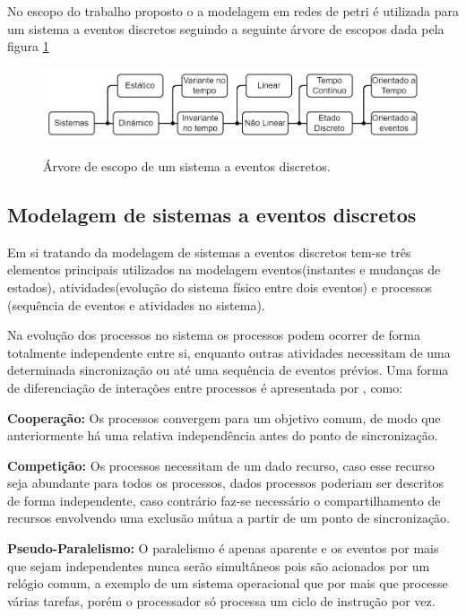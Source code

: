 No escopo do trabalho proposto o a modelagem em redes de petri é utilizada para um sistema a eventos discretos seguindo a seguinte árvore de escopos dada pela figura \ref{fig:arvore_escopo}
\begin{figure}
    \centering
    \caption{Árvore de escopo de um sistema a eventos discretos.}
    \includegraphics[scale=0.4]{figures/Petri/arvore_escopo.png}
    \label{fig:arvore_escopo}
\end{figure}

    
\subsection{Modelagem de sistemas a eventos discretos}

Em si tratando da modelagem de sistemas a eventos discretos tem-se três elementos principais utilizados na modelagem eventos(instantes e mudanças de estados), atividades(evolução do sistema físico entre dois eventos) e processos (sequência de eventos e atividades no sistema). 

Na evolução dos processos no sistema os processos podem ocorrer de forma totalmente independente entre si, enquanto outras atividades necessitam de uma determinada sincronização ou até uma sequência de eventos prévios. Uma forma de diferenciação de interações entre processos é apresentada por \cite{vallete}, como:

\textbf{Cooperação:} Os processos convergem para um objetivo comum, de modo que anteriormente há uma relativa independência antes do ponto de sincronização.

\textbf{Competição:} Os processos necessitam de um dado recurso, caso esse recurso seja abundante para todos os processos, dados processos poderiam ser descritos de forma independente, caso contrário faz-se necessário o compartilhamento de recursos envolvendo uma exclusão mútua a partir de um ponto de sincronização.

\textbf{Pseudo-Paralelismo:} O paralelismo é apenas aparente e os eventos por mais que sejam independentes nunca serão simultâneos pois são acionados por um relógio comum, a exemplo de um sistema operacional que por mais que processe várias tarefas, porém o processador só processa um ciclo de instrução por vez.

